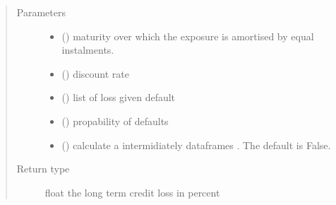 \documentclass[letterpaper,10pt,english]{sphinxmanual}
\begin{document}
\begin{fulllineitems}
\label{\detokenize{unsorted/model_financial_stability:model_financial_stability.lifetime_credit_loss}}
\pysigstartsignatures
{}
\pysigstopsignatures\begin{quote}\begin{description}
\item[{Parameters}] \leavevmode\begin{itemize}
\item {} 
\sphinxAtStartPar
{} () \textendash{} maturity over which the exposure is amortised \sphinxhyphen{} by equal instalments.

\item {} 
\sphinxAtStartPar
{} () \textendash{} discount rate

\item {} 
\sphinxAtStartPar
{} () \textendash{} list of loss given default

\item {} 
\sphinxAtStartPar
{} () \textendash{} propability of defaults

\item {} 
\sphinxAtStartPar
{} (\sphinxstyleliteralemphasis{\sphinxupquote{, }}) \textendash{} calculate a intermidiately dataframes . The default is False.

\end{itemize}

\item[{Return type}] \leavevmode
\sphinxAtStartPar
float the long term credit loss in percent

\end{description}\end{quote}

\end{fulllineitems}
\end{document}
